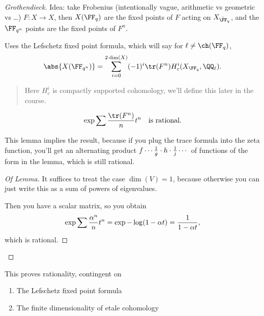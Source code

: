 \begin{proof}[Grothendieck]

Idea: take Frobenius (intentionally vague, arithmetic vs geometric vs
\ldots) \(F:X\to X\), then \(X(\FF_q)\) are the fixed points of \(F\)
acting on \(X_{\bar \FF_q}\), and the \(\FF_{q^n}\) points are the fixed
points of \(F^n\).

Uses the Lefschetz fixed point formula, which will say for
\(\ell\neq \ch(\FF_q)\),
\begin{align*}  
\abs{X(\FF_{q^n})} = \sum_{i=0}^{2\dim(X)} (-1)^i \tr(F^n) H^i_c(X_{\FF_q}, \QQ_\ell)
.\end{align*}

\begin{quote}
Here \(H^i_c\) is compactly supported cohomology, we'll define this
later in the course.
\end{quote}

\begin{lemma}

\begin{align*}  
\exp{\sum {\tr(F^n) \over n}t^n  }\quad\text{is rational}
.\end{align*}

\end{lemma}

This lemma implies the result, because if you plug the trace formula
into the zeta function, you'll get an alternating product
\(f \cdots {1\over g} \cdot h \cdot {1\over j} \cdots\) of functions of
the form in the lemma, which is still rational.

\begin{proof}[Of Lemma]

It suffices to treat the case \(\dim(V) = 1\), because otherwise you can
just write this as a sum of powers of eigenvalues.

Then you have a scalar matrix, so you obtain
\begin{align*}  
\exp{ \sum {\alpha^n \over n} t^n} = \exp{ -\log(1 - \alpha t)} = {1 \over 1-\alpha t}
,\end{align*} which is rational.

\end{proof}

\end{proof}

This proves rationality, contingent on

\begin{enumerate}
\def\labelenumi{\arabic{enumi}.}
\tightlist
\item
  The Lefschetz fixed point formula
\item
  The finite dimensionality of etale cohomology
\end{enumerate}

